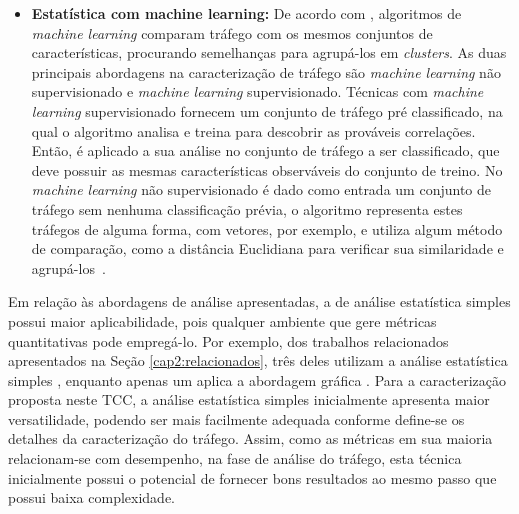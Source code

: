 \begin{itemize}
	\item{\textbf{Estatística com machine learning: }}De acordo com , algoritmos de \textit{machine learning} comparam tráfego com os mesmos conjuntos de características, procurando semelhanças para agrupá-los em \textit{clusters}. 
	As duas principais abordagens na caracterização de tráfego são \textit{machine learning} não supervisionado e \textit{machine learning} supervisionado.
	Técnicas com \textit{machine learning} supervisionado fornecem um conjunto de tráfego pré classificado, na qual o algoritmo analisa e treina para descobrir as prováveis correlações. 
    Então, é aplicado a sua análise no conjunto de tráfego a ser classificado, que deve possuir as mesmas características observáveis do conjunto de treino.
	No \textit{machine learning} não supervisionado é dado como entrada um conjunto de tráfego sem nenhuma classificação prévia, o algoritmo representa estes tráfegos de alguma forma, com vetores, por exemplo, e utiliza algum método de comparação, como a distância Euclidiana para verificar sua similaridade e agrupá-los~\cite{williams:2006:machinelearningcomparison}.	
\end{itemize}

Em relação às abordagens de análise apresentadas, a de análise estatística simples possui maior aplicabilidade, pois qualquer ambiente que gere métricas quantitativas pode empregá-lo.
%
Por exemplo, dos trabalhos relacionados apresentados na Seção \ref{cap2:relacionados}, três deles utilizam a análise estatística simples \cite{Sciammarella:2016:controltraffic, Wang:2010:ec2networkperformance, venzano:2013:trafficprivatecloud}, enquanto apenas um aplica a abordagem gráfica \cite{sharma:2015:hansel}.
%
Para a caracterização proposta neste TCC, a análise estatística simples inicialmente apresenta maior versatilidade, podendo ser mais facilmente adequada conforme define-se os detalhes da caracterização do tráfego.
%
Assim, como as métricas em sua maioria relacionam-se com desempenho, na fase de análise do tráfego, esta  técnica inicialmente possui o potencial de fornecer bons resultados ao mesmo passo que possui baixa complexidade.

